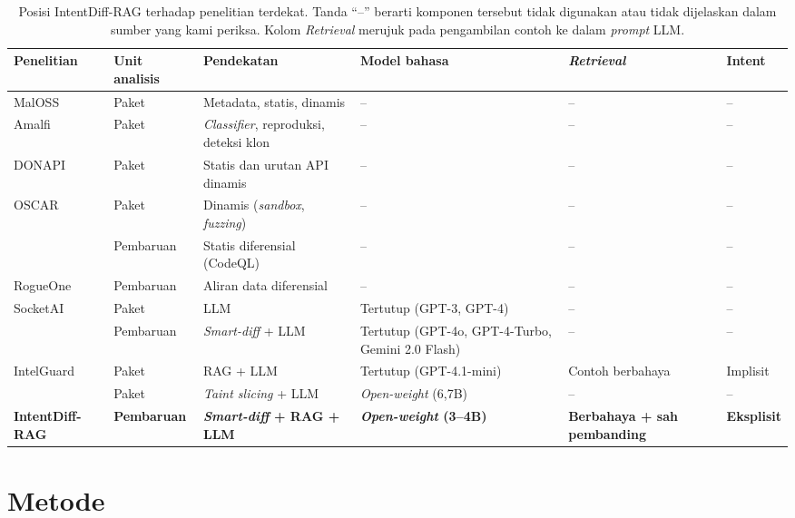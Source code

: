 \documentclass[a4paper,fleqn]{cas-dc}
\begin{document}
\begin{table}[t]
\caption{Posisi IntentDiff-RAG terhadap penelitian terdekat. Tanda ``--''
berarti komponen tersebut tidak digunakan atau tidak dijelaskan dalam sumber
yang kami periksa. Kolom \emph{Retrieval} merujuk pada pengambilan contoh ke
dalam \emph{prompt} LLM.}
\label{tab:positioning}
\small
\begin{tabular}{p{3.2cm} p{1.6cm} p{3.9cm} p{3.2cm} p{2.4cm} p{1.8cm}}
\hline
Penelitian & Unit analisis & Pendekatan & Model bahasa & \emph{Retrieval} & Intent \\
\hline
MalOSS \citep{duan2021towards} & Paket & Metadata, statis, dinamis & -- & -- & -- \\
Amalfi \citep{sejfia2022practical} & Paket & \emph{Classifier}, reproduksi, deteksi klon & -- & -- & -- \\
DONAPI \citep{huang2024donapi} & Paket & Statis dan urutan API dinamis & -- & -- & -- \\
OSCAR \citep{zheng2024towards} & Paket & Dinamis (\emph{sandbox}, \emph{fuzzing}) & -- & -- & -- \\
\citet{froh2023differential} & Pembaruan & Statis diferensial (CodeQL) & -- & -- & -- \\
RogueOne \citep{sofaer2024rogueone} & Pembaruan & Aliran data diferensial & -- & -- & -- \\
SocketAI \citep{zahan2025leveraging} & Paket & LLM & Tertutup (GPT-3, GPT-4) & -- & -- \\
\citet{wyss2025evaluating} & Pembaruan & \emph{Smart-diff} + LLM & Tertutup (GPT-4o, GPT-4-Turbo, Gemini 2.0 Flash) & -- & -- \\
IntelGuard \citep{guo2026bridging} & Paket & RAG + LLM & Tertutup (GPT-4.1-mini) & Contoh berbahaya & Implisit \\
\citet{nguyen2025taint} & Paket & \emph{Taint slicing} + LLM & \emph{Open-weight} (6,7B) & -- & -- \\
\textbf{IntentDiff-RAG} & \textbf{Pembaruan} & \textbf{\emph{Smart-diff} + RAG + LLM} & \textbf{\emph{Open-weight} (3--4B)} & \textbf{Berbahaya + sah pembanding} & \textbf{Eksplisit} \\
\hline
\end{tabular}
\end{table}

\section{Metode}\label{sec:method}
\end{document}
